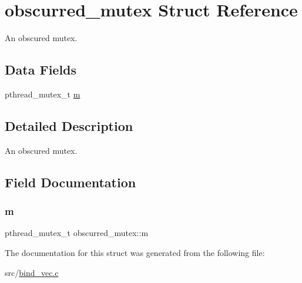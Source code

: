 \hypertarget{structobscurred__mutex}{}\section{obscurred\+\_\+mutex Struct Reference}
\label{structobscurred__mutex}


An obscured mutex.  


\subsection*{Data Fields}
\begin{DoxyCompactItemize}
\item 
pthread\+\_\+mutex\+\_\+t \hyperlink{structobscurred__mutex_a02b4b692e6fc0a9b4849671117317201}{m}
\end{DoxyCompactItemize}


\subsection{Detailed Description}
An obscured mutex. 

\subsection{Field Documentation}
\mbox{\label{structobscurred__mutex_a02b4b692e6fc0a9b4849671117317201}} 
\subsubsection{\texorpdfstring{m}{m}}
{\footnotesize\ttfamily pthread\+\_\+mutex\+\_\+t obscurred\+\_\+mutex\+::m}



The documentation for this struct was generated from the following file\+:\begin{DoxyCompactItemize}
\item 
src/\hyperlink{bind__vec_8c}{bind\+\_\+vec.\+c}\end{DoxyCompactItemize}
